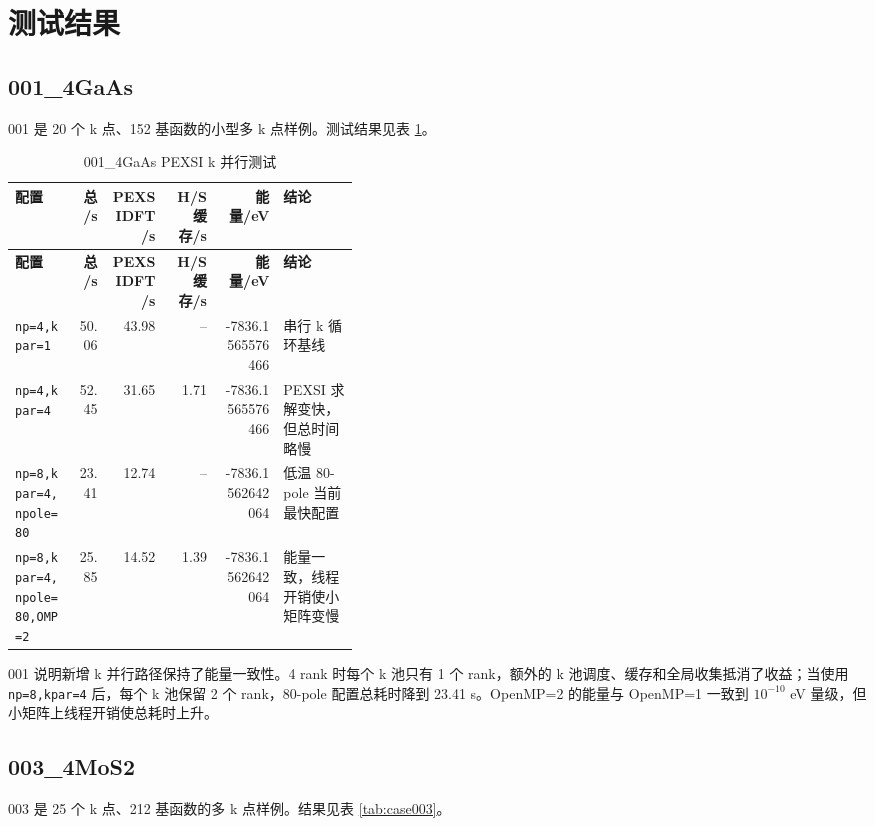 \documentclass[a4paper,11pt]{article}
\newcommand{\code}[1]{\texttt{#1}}
\begin{document}
\section{测试结果}

\subsection{001\_4GaAs}

001 是 20 个 k 点、152 基函数的小型多 k 点样例。测试结果见表 \ref{tab:case001}。

\begin{longtable}{@{}p{0.18\linewidth}r r r r p{0.22\linewidth}@{}}
\caption{001\_4GaAs PEXSI k 并行测试}
\label{tab:case001}\\
\toprule
\textbf{配置} & \textbf{总/s} & \textbf{PEXSIDFT/s} & \textbf{H/S 缓存/s} & \textbf{能量/eV} & \textbf{结论}\\
\midrule
\endfirsthead
\toprule
\textbf{配置} & \textbf{总/s} & \textbf{PEXSIDFT/s} & \textbf{H/S 缓存/s} & \textbf{能量/eV} & \textbf{结论}\\
\midrule
\endhead
\code{np=4,kpar=1} & 50.06 & 43.98 & -- & -7836.1565576466 & 串行 k 循环基线\\
\code{np=4,kpar=4} & 52.45 & 31.65 & 1.71 & -7836.1565576466 & PEXSI 求解变快，但总时间略慢\\
\code{np=8,kpar=4,npole=80} & 23.41 & 12.74 & -- & -7836.1562642064 & 低温 80-pole 当前最快配置\\
\code{np=8,kpar=4,npole=80,OMP=2} & 25.85 & 14.52 & 1.39 & -7836.1562642064 & 能量一致，线程开销使小矩阵变慢\\
\bottomrule
\end{longtable}

001 说明新增 k 并行路径保持了能量一致性。4 rank 时每个 k 池只有 1 个 rank，额外的 k 池调度、缓存和全局收集抵消了收益；当使用 \code{np=8,kpar=4} 后，每个 k 池保留 2 个 rank，80-pole 配置总耗时降到 23.41 s。OpenMP=2 的能量与 OpenMP=1 一致到 \(10^{-10}\) eV 量级，但小矩阵上线程开销使总耗时上升。

\subsection{003\_4MoS2}

003 是 25 个 k 点、212 基函数的多 k 点样例。结果见表 \ref{tab:case003}。
\end{document}
